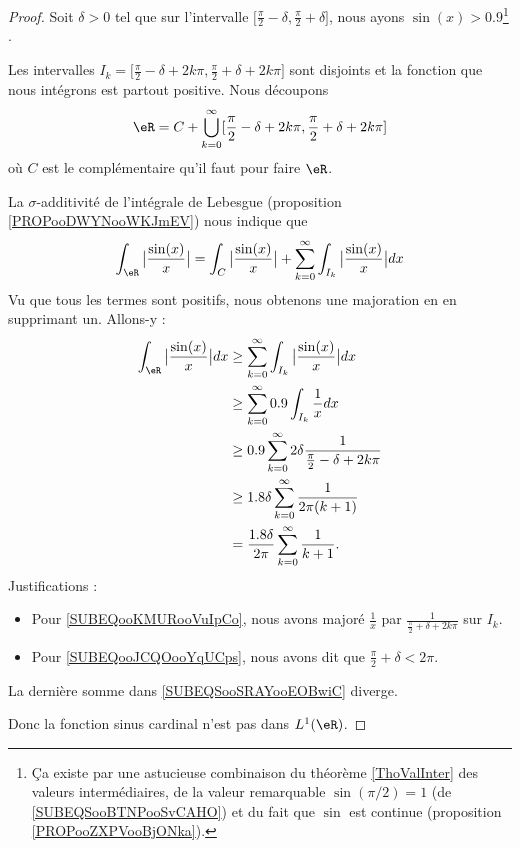 \begin{proof}
    Soit \( \delta>0\) tel que sur l'intervalle \( \mathopen[ \frac{ \pi }{2}-\delta , \frac{ \pi }{ 2 }+\delta \mathclose]\), nous ayons \( \sin(x)>0.9\)\footnote{Ça existe par une astucieuse combinaison du théorème \ref{ThoValInter} des valeurs intermédiaires, de la valeur remarquable \( \sin(\pi/2)=1\) (de \eqref{SUBEQSooBTNPooSvCAHO}) et du fait que \( \sin\) est continue (proposition \ref{PROPooZXPVooBjONka}).} .

    Les intervalles \( I_k=\mathopen[ \frac{ \pi }{2}-\delta+2k\pi , \frac{ \pi }{2}+\delta+2k\pi \mathclose]\) sont disjoints et la fonction que nous intégrons est partout positive. Nous découpons
    \begin{equation}
        \eR=C+\bigcup_{k=0}^{\infty}\mathopen[ \frac{ \pi }{2}-\delta+2k\pi , \frac{ \pi }{2}+\delta+2k\pi \mathclose]
    \end{equation}
    où \( C\) est le complémentaire qu'il faut pour faire \( \eR\).

    La \( \sigma\)-additivité de l'intégrale de Lebesgue (proposition \ref{PROPooDWYNooWKJmEV}) nous indique que
    \begin{equation}
        \int_{\eR}\big| \frac{ \sin(x) }{ x } \big|= \int_C\big| \frac{ \sin(x) }{ x } \big|+  \sum_{k=0}^{\infty}\int_{I_k}\big| \frac{ \sin(x) }{ x } \big|dx
    \end{equation}
    Vu que tous les termes sont positifs, nous obtenons une majoration en en supprimant un. Allons-y :
    \begin{subequations}        \label{SUBEQSooSRAYooEOBwiC}
        \begin{align}
            \int_{\eR}\big| \frac{ \sin(x) }{ x } \big|dx&\geq \sum_{k=0}^{\infty}\int_{I_k}\big| \frac{ \sin(x) }{ x } \big|dx\\
            &\geq\sum_{k=0}^{\infty}0.9\int_{I_k}\frac{ 1 }{ x }dx\\
            &\geq 0.9\sum_{k=0}^{\infty}2\delta\frac{1}{ \frac{ \pi }{2}-\delta+2k\pi }     \label{SUBEQooKMURooVuIpCo}\\
            &\geq 1.8\delta\sum_{k=0}^{\infty}\frac{1}{ 2\pi(k+1) }     \label{SUBEQooJCQOooYqUCps}\\
            &=\frac{ 1.8\delta }{ 2\pi }\sum_{k=0}^{\infty}\frac{1}{ k+1 }.
        \end{align}
    \end{subequations}
    Justifications :
    \begin{itemize}
        \item Pour \eqref{SUBEQooKMURooVuIpCo}, nous avons majoré \( \frac{1}{ x }\) par \( \frac{1}{ \frac{ \pi }{ 2 }+\delta+2k\pi }\) sur \( I_k\).
        \item Pour \eqref{SUBEQooJCQOooYqUCps}, nous avons dit que \( \frac{ \pi }{2}+\delta<2\pi\).
    \end{itemize}
    La dernière somme dans \eqref{SUBEQSooSRAYooEOBwiC} diverge.

    Donc la fonction sinus cardinal n'est pas dans \( L^1(\eR)\).
\end{proof}

